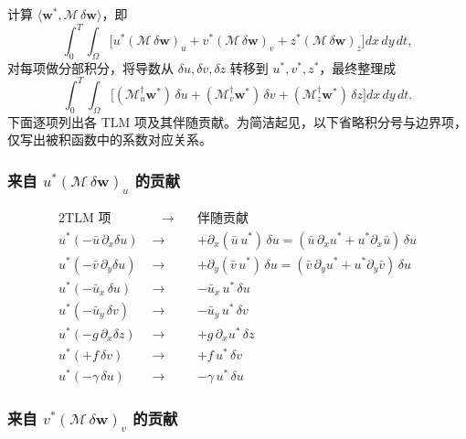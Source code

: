 \documentclass[12pt,a4paper,twoside]{article}
\begin{document}
计算 $\langle \mathbf{w}^*, \mathcal{M}\,\delta\mathbf{w} \rangle$，即
\[
    \int_0^T \int_\Omega \Big[
        u^* (\mathcal{M}\,\delta\mathbf{w})_u
        + v^* (\mathcal{M}\,\delta\mathbf{w})_v
        + z^* (\mathcal{M}\,\delta\mathbf{w})_z
    \Big] dx\,dy\,dt,
\]
对每项做分部积分，将导数从 $\delta u, \delta v, \delta z$ 转移到 $u^*, v^*, z^*$，最终整理成
\[
    \int_0^T \int_\Omega \Big[
        (\mathcal{M}^\dagger_u\mathbf{w}^*)\,\delta u
        + (\mathcal{M}^\dagger_v\mathbf{w}^*)\,\delta v
        + (\mathcal{M}^\dagger_z\mathbf{w}^*)\,\delta z
    \Big] dx\,dy\,dt.
\]
下面逐项列出各 TLM 项及其伴随贡献。为简洁起见，以下省略积分号与边界项，仅写出被积函数中的系数对应关系。

\subsubsection*{来自 $u^* (\mathcal{M}\,\delta\mathbf{w})_u$ 的贡献}

\begin{alignat*}{2}
    \text{TLM 项} &\quad\longrightarrow\quad & \text{伴随贡献} \\
    u^*(-\bar u\,\partial_x\delta u) &\;\longrightarrow\; & +\partial_x(\bar u\,u^*)\,\delta u = (\bar u\,\partial_x u^* + u^*\partial_x\bar u)\,\delta u \\
    u^*(-\bar v\,\partial_y\delta u) &\;\longrightarrow\; & +\partial_y(\bar v\,u^*)\,\delta u = (\bar v\,\partial_y u^* + u^*\partial_y\bar v)\,\delta u \\
    u^*(-\bar u_x\,\delta u) &\;\longrightarrow\; & -\bar u_x\,u^*\,\delta u \\
    u^*(-\bar u_y\,\delta v) &\;\longrightarrow\; & -\bar u_y\,u^*\,\delta v \\
    u^*(-g\,\partial_x\delta z) &\;\longrightarrow\; & +g\,\partial_x u^*\,\delta z \\
    u^*(+f\,\delta v) &\;\longrightarrow\; & +f\,u^*\,\delta v \\
    u^*(-\gamma\,\delta u) &\;\longrightarrow\; & -\gamma\,u^*\,\delta u
\end{alignat*}

\subsubsection*{来自 $v^* (\mathcal{M}\,\delta\mathbf{w})_v$ 的贡献}
\end{document}
